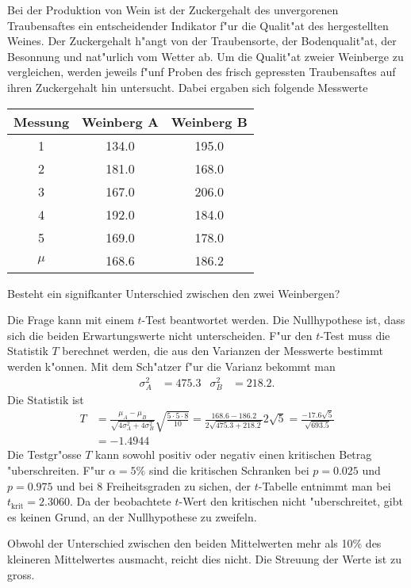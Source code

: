 Bei der Produktion von Wein ist der Zuckergehalt des unvergorenen
Traubensaftes ein entscheidender Indikator f"ur die Qualit"at des
hergestellten Weines. Der Zuckergehalt h"angt von der Traubensorte,
der Bodenqualit"at, der Besonnung und nat"urlich vom Wetter ab.
Um die Qualit"at zweier Weinberge zu vergleichen, werden jeweils
f"unf Proben
des frisch gepressten Traubensaftes auf ihren Zuckergehalt hin
untersucht. Dabei ergaben sich folgende Messwerte

\begin{center}
\begin{tabular}{|c|cc|}
\hline
Messung&Weinberg A&Weinberg B\\
\hline
1&134.0&195.0\\
2&181.0&168.0\\
3&167.0&206.0\\
4&192.0&184.0\\
5&169.0&178.0\\
\hline
$\mu$ &168.6&186.2\\
\hline
\end{tabular}
\end{center}
Besteht ein signifkanter Unterschied zwischen den zwei Weinbergen?

\begin{loesung}
Die Frage kann mit einem $t$-Test beantwortet werden.
Die Nullhypothese ist, dass sich die beiden Erwartungswerte
nicht unterscheiden. F"ur den $t$-Test muss die Statistik $T$
berechnet werden, die aus den Varianzen der Messwerte 
bestimmt werden k"onnen. Mit dem Sch"atzer f"ur die Varianz
bekommt man
\begin{align*}
\sigma_A^2&=475.3&
\sigma_B^2&=218.2.
\end{align*}
Die Statistik ist
\begin{align*}
T&=\frac{\mu_A-\mu_B}{\sqrt{4\sigma_A^2+4\sigma_B^2}}\sqrt{\frac{5\cdot5\cdot 8}{10}}
=\frac{168.6-186.2}{2\sqrt{475.3+218.2}}2\sqrt{5}
=\frac{-17.6\sqrt{5}}{\sqrt{693.5}}
\\
&=-1.4944
\end{align*}
Die Testgr"osse $T$ kann sowohl positiv oder negativ einen kritischen
Betrag "uberschreiten.
F"ur $\alpha=5\%$ sind die kritischen Schranken bei $p=0.025$ und $p=0.975$
und bei $8$ Freiheitsgraden zu sichen, der $t$-Tabelle entnimmt man
bei $t_{\text{krit}}=2.3060$. Da der beobachtete $t$-Wert den kritischen
nicht "uberschreitet, gibt es keinen Grund, an der Nullhypothese
zu zweifeln.

Obwohl der Unterschied zwischen den beiden Mittelwerten mehr als 10\%
des kleineren Mittelwertes ausmacht, reicht dies nicht. Die Streuung
der Werte ist zu gross.
\end{loesung}

